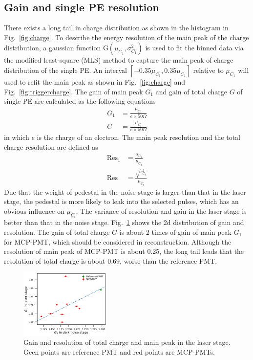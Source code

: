 \subsection{Gain and single PE resolution}
\label{sec:noisegain}
There exists a long tail in charge distribution as shown in the histogram in Fig.~\ref{fig:charge}. To describe the energy resolution of the main peak of the charge distribution, a gaussian function G$(\mu_{C_1},\sigma^2_{C_1})$ is used to fit the binned data via the modified least-square (MLS) method \cite{Cowan1998StatisticalDA} to capture the main peak of charge distribution of the single PE. An interval $[-0.35\mu_{C_1}, 0.35\mu_{C_1}]$ relative to $\mu_{C_1}$ will used to refit the main peak as shown in Fig.~\ref{fig:charge} and Fig.~\ref{fig:triggercharge}. The gain of main peak $G_1$ and gain of total charge $G$ of single PE are calculated as the following equations
\begin{align}
    G_1&=\frac{\mu_{C_1}}{e\times 50\Omega} \\
    G &= \frac{\mu_{C_t}}{e\times 50\Omega}
\end{align}
in which $e$ is the charge of an electron. The main peak resolution and the total charge resolution are defined as
\begin{align}
    \mathrm{Res}_1&=\frac{\sigma_{C_1}}{\mu_{C_1}}\\
    \mathrm{Res}&=\frac{\sqrt{s^2_{C_t}}}{\mu_{C_t}}
\end{align}
Due that the weight of pedestal in the noise stage is larger than that in the laser stage, the pedestal is more likely to leak into the selected pulses, which has an obvious influence on $\mu_{C_t}$. The variance of resolution and gain in the laser stage is better than that in the noise stage. Fig.~\ref{fig:totalchargeCompare} shows the 2d distribution of gain and resolution.
 The gain of total charge $G$ is about 2 times of gain of main peak $G_1$ for MCP-PMT, which should be considered in reconstruction. Although the resolution of main peak of MCP-PMT is about 0.25, the long tail leads that the resolution of total charge is about 0.69, worse than the reference PMT.

\begin{figure}[!htbp]
    \centering
    \includegraphics[width=0.4\textwidth,page=4]{figures/result/compare.pdf}
    \caption{Gain and resolution of total charge and main peak in the laser stage. Geen points are reference PMT and red points are MCP-PMTs.}
    \label{fig:totalchargeCompare}
\end{figure}

